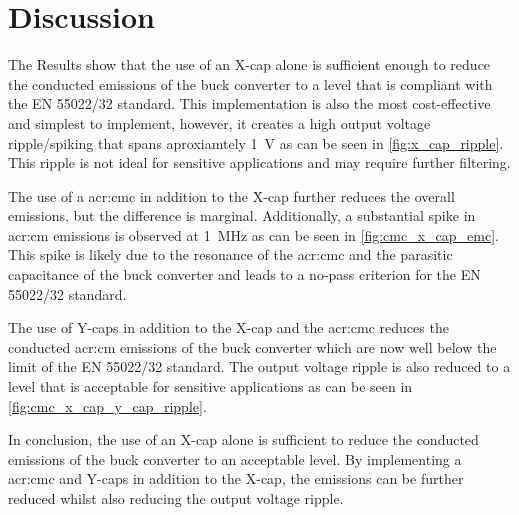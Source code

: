 \chapter{Discussion}
\label{chapter:discussion}

The Results show that the use of an X-cap alone is sufficient enough to reduce the conducted emissions of the buck converter to a level that is compliant with the EN 55022/32 standard. This implementation is also the most cost-effective and simplest to implement, however, it creates a high output voltage ripple/spiking that spans aproxiamtely \qty{1}{\volt} as can be seen in \autoref{fig:x_cap_ripple}. This ripple is not ideal for sensitive applications and may require further filtering.

The use of a \gls{acr:cmc} in addition to the X-cap further reduces the overall emissions, but the difference is marginal. Additionally, a substantial spike in \gls{acr:cm} emissions is observed at \qty{1}{\mega\hertz} as can be seen in \autoref{fig:cmc_x_cap_emc}. This spike is likely due to the resonance of the \gls{acr:cmc} and the parasitic capacitance of the buck converter and leads to a no-pass criterion for the EN 55022/32 standard.

The use of Y-caps in addition to the X-cap and the \gls{acr:cmc} reduces the conducted \gls{acr:cm} emissions of the buck converter which are now well below the limit of the EN 55022/32 standard. The output voltage ripple is also reduced to a level that is acceptable for sensitive applications as can be seen in \autoref{fig:cmc_x_cap_y_cap_ripple}.

In conclusion, the use of an X-cap alone is sufficient to reduce the conducted emissions of the buck converter to an acceptable level. 
By implementing a \gls{acr:cmc} and Y-caps in addition to the X-cap, the emissions can be further reduced whilst also reducing the output voltage ripple.

